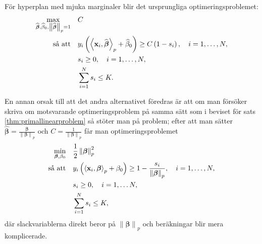 \documentclass[a4paper, 12pt]{report}
\theoremstyle{definition}
\theoremstyle{remark}
\newcommand{\bfbeta}{{\boldsymbol{\beta}}}
\newcommand{\bfx}{\mathbf{x}}
\newcommand{\llangle}{\left\langle}
\newcommand{\rrangle}{\right\rangle}
\newcommand{\inner}[2]{\llangle #1, #2 \rrangle}
\begin{document}
För hyperplan med mjuka marginaler blir det ursprungliga optimeringsproblemet:
\begin{equation}\label{opt:softmargin}
\begin{aligned}
\operatornamewithlimits{max}_{\widehat{\bfbeta},\widehat{\beta}_0,\left\|\widehat{\bfbeta}
\right\|_p=1}& & &C\\
\text{så att}& & &y_i\left(\inner{\bfx_i}{\widehat{\bfbeta}}_p+\widehat{\beta}_0\right)\geq C\left(1-s_i\right),\quad i=1,\dots,N,\\
& & &s_i\geq0,\quad i=1,\dots,N,\\
& & &\sum_{i=1}^{N}s_i \leq K.
\end{aligned}
\end{equation}

En annan orsak till att det andra alternativet föredras är att om man försöker skriva om motsvarande optimeringsproblem på samma sätt som i beviset för sats \ref{thm:primallinearproblem} så stöter man på problem; efter att man sätter $\widehat{\bfbeta}=\frac{\bfbeta}{\left\|\bfbeta
\right\|_p}$ och $C=\frac{1}{\left\|\bfbeta
\right\|_p}$ får man optimeringsproblemet
\begin{equation*}
\begin{aligned}
\operatornamewithlimits{min}_{\bfbeta,\beta_0} & & &\frac{1}{2}\left\|\bfbeta
\right\|_p^2\\
\text{så att} & & &y_i\left(\inner{\bfx_i}{\bfbeta}_p+\beta_0\right)\geq 1 - \frac{s_i}{\left\|\bfbeta\right\|_p},\quad i=1,\dots,N,\\
& & &s_i\geq0,\quad i=1,\dots N,\\
& & &\sum_{i=1}^{N} s_i \leq K,
\end{aligned}
\end{equation*}
där slackvariablerna direkt beror på $\left\|\bfbeta\right\|_p$ och beräkningar blir mera komplicerade.
\end{document}
